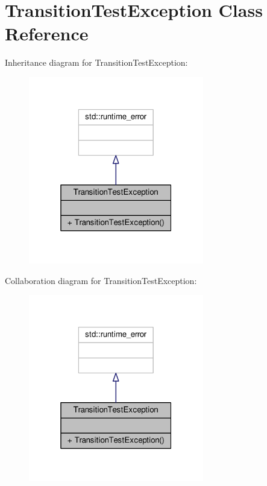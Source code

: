 \hypertarget{class_transition_test_exception}{}\section{Transition\+Test\+Exception Class Reference}
\label{class_transition_test_exception}


Inheritance diagram for Transition\+Test\+Exception\+:
\nopagebreak
\begin{figure}[H]
\begin{center}
\leavevmode
\includegraphics[width=217pt]{class_transition_test_exception__inherit__graph}
\end{center}
\end{figure}


Collaboration diagram for Transition\+Test\+Exception\+:
\nopagebreak
\begin{figure}[H]
\begin{center}
\leavevmode
\includegraphics[width=217pt]{class_transition_test_exception__coll__graph}
\end{center}
\end{figure}

